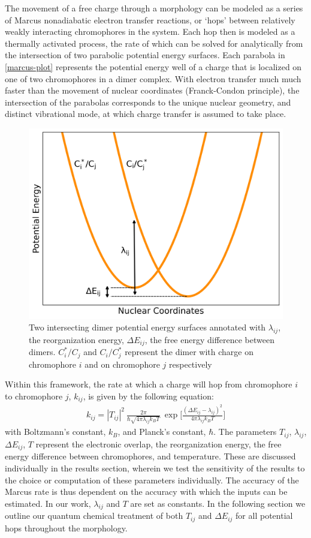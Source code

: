 The movement of a free charge through a morphology can be modeled as a series of 
Marcus nonadiabatic electron transfer
reactions, or `hops' between relatively weakly interacting chromophores in the system. 
Each hop then is modeled as a thermally activated process, the rate of which can be solved for analytically
from the intersection of two parabolic potential energy surfaces. 
Each parabola in \autoref{marcus-plot} represents the potential energy well of a charge that is localized on
one of two chromophores in a dimer complex. 
With electron transfer much much faster than the movement of nuclear coordinates (Franck-Condon principle),
the intersection of the parabolas corresponds to the unique nuclear geometry, and distinct vibrational mode, at
which charge transfer is assumed to take place. 

\begin{figure}
  \center
  \includegraphics[width=0.7\linewidth]{figures/marcus-plot.png} 
    \caption{Two intersecting dimer potential energy surfaces annotated with $\lambda_{ij}$, the
    reorganization energy, $\Delta E_{ij}$, the free energy difference between dimers. $C_{i}^*/C_{j}$ 
    and $C_{i}/C_{j}^*$ represent the dimer with charge on chromophore $i$ and on
    chromophore $j$ respectively}
  \label{marcus-plot}
\end{figure}

Within this framework, the rate at which a charge will hop from chromophore $i$ to chromophore $j$, $k_{ij}$,
is given by the following equation:
\begin{align}
    k_{ij}  =  |T_{ij}|^2\ \frac{2\pi}{\hbar \sqrt{4 \pi \lambda_{ij} k_{B} T}}\ \exp{\Bigg[ \frac{(\Delta
    E_{ij} - \lambda_{ij})^2}{ 4 \pi \lambda_{ij} k_{B} T} \Bigg] }
    \label{marcus}
\end{align}
with Boltzmann's constant, $k_{B}$, and Planck's constant, $\hbar$. The parameters $T_{ij}$, $\lambda_{ij}$,
$\Delta E_{ij}$, $T$ represent the electronic overlap, the reorganization energy, the free energy difference
between chromophores, and
temperature. These are discussed individually in the results section, wherein we test the sensitivity of
the  results to the choice or computation of these parameters individually.
The accuracy of the Marcus rate is thus dependent on the accuracy with which the inputs can be estimated. In
our work, $\lambda_{ij}$ and $T$ are set as constants. In
the following section we outline our quantum chemical treatment of both $T_{ij}$ and $\Delta E_{ij}$ for all
potential hops throughout the morphology.

